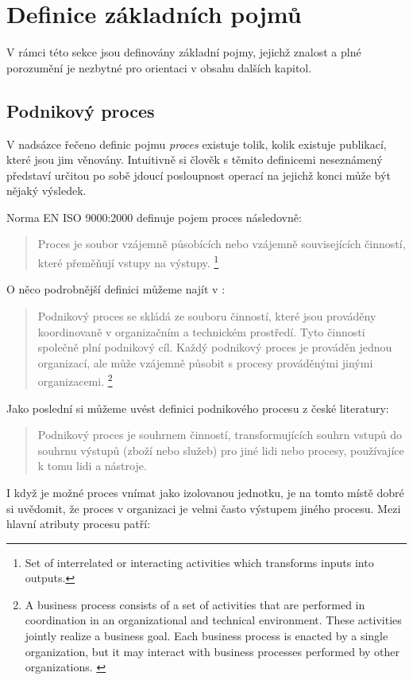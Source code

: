\documentclass[]{article}
\begin{document}
\section{Definice základních pojmů}
V rámci této sekce jsou definovány základní pojmy, jejichž znalost a plné porozumění je nezbytné pro orientaci v obsahu dalších kapitol.
\subsection{Podnikový proces}
V nadsázce řečeno definic pojmu \textit{proces} existuje tolik, kolik existuje publikací, které jsou jim věnovány. Intuitivně si člověk s těmito definicemi neseznámený představí určitou po sobě jdoucí posloupnost operací na jejichž konci může být nějaký výsledek.

Norma EN ISO 9000:2000 definuje pojem proces následovně: \cite{iso_9000}

\begin{quote}
Proces je soubor vzájemně působících nebo vzájemně souvisejících činností, které přeměňují vstupy na výstupy.
\footnote{Set of interrelated or interacting activities which transforms inputs into outputs.}
\end{quote}

O něco podrobnější definici můžeme najít v \cite{Weske2007}:

\begin{quote}
Podnikový proces se skládá ze souboru činností, které jsou prováděny koordinovaně v organizačním a technickém prostředí. Tyto činnosti společně plní podnikový cíl. Každý podnikový proces je prováděn jednou organizací, ale může vzájemně působit s procesy prováděnými jinými organizacemi.
\footnote{A business process consists of a set of activities that are performed in coordination in an organizational and technical environment. These activities jointly realize a business goal. Each business process is enacted by a single organization, but it may interact with business processes performed by other organizations. \cite{Weske2007}}
\end{quote}

Jako poslední si můžeme uvést definici podnikového procesu z české literatury: \cite{Repa2007}
\begin{quote}
Podnikový proces je souhrnem činností, transformujících souhrn vstupů do souhrnu výstupů (zboží nebo služeb) pro jiné lidi nebo procesy, používajíce k tomu lidi a nástroje.
\end{quote}

I když je možné proces vnímat jako izolovanou jednotku, je na tomto místě dobré si uvědomit, že proces v organizaci je velmi často výstupem jiného procesu. Mezi hlavní atributy procesu patří: \cite{Bandor2007}
\end{document}
